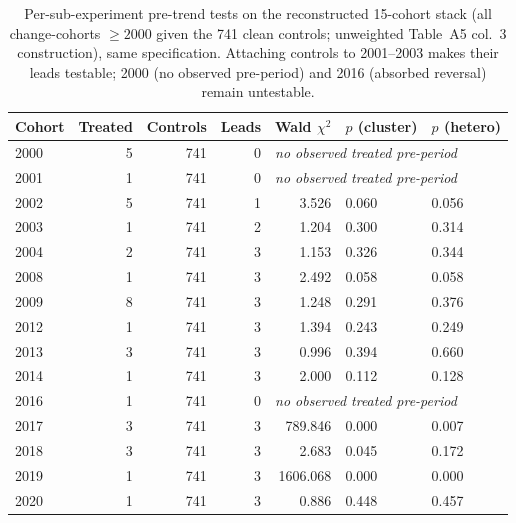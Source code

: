\begin{table}[t]\centering
\caption{Per-sub-experiment pre-trend tests on the reconstructed 15-cohort stack (all change-cohorts $\ge 2000$ given the 741 clean controls; unweighted Table~A5 col.\ 3 construction), same specification. Attaching controls to 2001--2003 makes their leads testable; 2000 (no observed pre-period) and 2016 (absorbed reversal) remain untestable.}
\label{tab:pretrend-recon15}
\begin{tabular}{lrrrrll}
\toprule
Cohort & Treated & Controls & Leads & Wald $\chi^2$ & $p$ (cluster) & $p$ (hetero) \\
\midrule
2000 & 5 & 741 & 0 & \multicolumn{3}{l}{\textit{no observed treated pre-period}} \\
2001 & 1 & 741 & 0 & \multicolumn{3}{l}{\textit{no observed treated pre-period}} \\
2002 & 5 & 741 & 1 & 3.526 & 0.060 & 0.056 \\
2003 & 1 & 741 & 2 & 1.204 & 0.300 & 0.314 \\
2004 & 2 & 741 & 3 & 1.153 & 0.326 & 0.344 \\
2008 & 1 & 741 & 3 & 2.492 & 0.058 & 0.058 \\
2009 & 8 & 741 & 3 & 1.248 & 0.291 & 0.376 \\
2012 & 1 & 741 & 3 & 1.394 & 0.243 & 0.249 \\
2013 & 3 & 741 & 3 & 0.996 & 0.394 & 0.660 \\
2014 & 1 & 741 & 3 & 2.000 & 0.112 & 0.128 \\
2016 & 1 & 741 & 0 & \multicolumn{3}{l}{\textit{no observed treated pre-period}} \\
2017 & 3 & 741 & 3 & 789.846 & 0.000 & 0.007 \\
2018 & 3 & 741 & 3 & 2.683 & 0.045 & 0.172 \\
2019 & 1 & 741 & 3 & 1606.068 & 0.000 & 0.000 \\
2020 & 1 & 741 & 3 & 0.886 & 0.448 & 0.457 \\
\bottomrule
\end{tabular}
\end{table}
